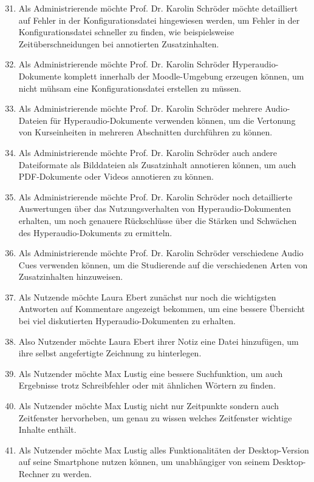 \begin{enumerate}[label=US-\arabic*:,ref=US-\arabic*]
\setcounter{enumi}{30}
\item Als Administrierende möchte Prof. Dr. Karolin Schröder möchte detailliert auf Fehler in der Konfigurationsdatei hingewiesen werden, um Fehler in der Konfigurationsdatei schneller zu finden, wie beispielsweise Zeitüberschneidungen bei annotierten Zusatzinhalten.
\item Als Administrierende möchte Prof. Dr. Karolin Schröder Hyperaudio-Dokumente komplett innerhalb der Moodle-Umgebung erzeugen können, um nicht mühsam eine Konfigurationsdatei erstellen zu müssen.
\item Als Administrierende möchte Prof. Dr. Karolin Schröder mehrere Audio-Dateien für Hyperaudio-Dokumente verwenden können, um die Vertonung von Kurseinheiten in mehreren Abschnitten durchführen zu können.
\item Als Administrierende möchte Prof. Dr. Karolin Schröder auch andere Dateiformate als Bilddateien als Zusatzinhalt annotieren können, um auch PDF-Dokumente oder Videos annotieren zu können.
\item Als Administrierende möchte Prof. Dr. Karolin Schröder noch detaillierte Auswertungen über das Nutzungsverhalten von Hyperaudio-Dokumenten erhalten, um noch genauere Rückschlüsse über die Stärken und Schwächen des Hyperaudio-Dokuments zu ermitteln. 
\item Als Administrierende möchte Prof. Dr. Karolin Schröder verschiedene Audio Cues verwenden können, um die Studierende auf die verschiedenen Arten von Zusatzinhalten hinzuweisen.
\item Als Nutzende möchte Laura Ebert zunächst nur noch die wichtigsten Antworten auf Kommentare angezeigt bekommen, um eine bessere Übersicht bei viel diskutierten Hyperaudio-Dokumenten zu erhalten.
\item Also Nutzender möchte Laura Ebert ihrer Notiz eine Datei hinzufügen, um ihre selbst angefertigte Zeichnung zu hinterlegen.
\item Als Nutzender möchte Max Lustig eine bessere Suchfunktion, um auch Ergebnisse trotz Schreibfehler oder mit ähnlichen Wörtern zu finden.
\item Als Nutzender möchte Max Lustig nicht nur Zeitpunkte sondern auch Zeitfenster hervorheben, um genau zu wissen welches Zeitfenster wichtige Inhalte enthält.
\item Als Nutzender möchte Max Lustig alles Funktionalitäten der Desktop-Version auf seine Smartphone nutzen können, um unabhängiger von seinem Desktop-Rechner zu werden.
\end{enumerate}

